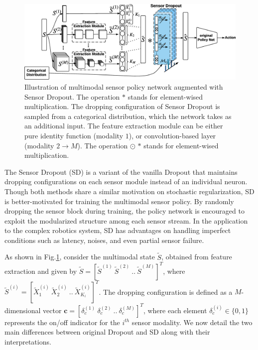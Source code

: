 \documentclass[../thesis.tex]{subfiles}
\begin{document}
\begin{figure}[t]
        \begin{center}
\centerline{\includegraphics[width=0.8\columnwidth]{./MultimodalDRL/fig/SD_new}} %
        \caption{Illustration of multimodal sensor policy network augmented with Sensor Dropout. The operation $*$ stands for element-wised multiplication. The dropping configuration of Sensor Dropout is sampled from a categorical distribution, which the network takes as an additional input. The feature extraction module can be either pure identity function (modality $1$), or convolution-based layer (modality $2 \to M$). The operation $\odot$ $*$ stands for element-wised multiplication.}
        \label{fig:Multi-SD}
        \end{center}
\end{figure}
 
 
The Sensor Dropout (SD) is a variant of the vanilla Dropout \cite{dropout} that maintains dropping configurations on each sensor module instead of an individual neuron. Though both methods share a similar motivation on stochastic regularization, SD is better-motivated for training the multimodal sensor policy. By randomly dropping the sensor block during training, the policy network is encouraged to exploit the modularized structure among each sensor stream. In the application to the complex robotics system, SD has advantages on handling imperfect conditions such as latency, noises, and even partial sensor failure.
 
 
As shown in Fig.\ref{fig:Multi-SD}, consider the multimodal state $\tilde{S}$, obtained from feature extraction and given by $\tilde{S}=[\tilde{S}^{(1)}~\tilde{S}^{(2)}~..~\tilde{S}^{(M)}]^T$, where $\tilde{S}^{(i)}= [\tilde{X}_1^{(i)}~\tilde{X}_2^{(i)}~..~\tilde{X}_{K_i}^{(i)}]^T$.
The dropping configuration is defined as a $M$-dimensional vector $\mathbf{c} = [\delta_{c}^{(1)}~\delta_{c}^{(2)}~..~\delta_{c}^{(M)}]^T$, where each element $\delta_{c}^{(i)} \in \{0,1\}$ represents the on/off indicator for the $i^{th}$ sensor modality. We now detail the two main differences between original Dropout and SD along with their interpretations.
 
\end{document}
